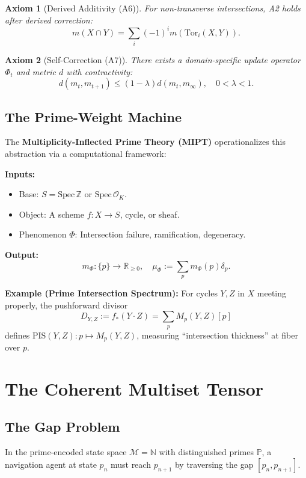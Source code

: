 \documentclass[12pt,a4paper]{article}
\newtheorem{axiom}{Axiom}[section]
\begin{document}
\begin{axiom}[Derived Additivity (A6)]
For non-transverse intersections, A2 holds after derived correction:
\[
m(X \cap Y) = \sum_i (-1)^i m(\text{Tor}_i(X, Y)).
\]
\end{axiom}

\begin{axiom}[Self-Correction (A7)]
There exists a domain-specific update operator $\Phi_t$ and metric $d$ with contractivity:
\[
d(m_t, m_{t+1}) \le (1 - \lambda) d(m_t, m_\infty), \quad 0 < \lambda < 1.
\]
\end{axiom}

\subsection{The Prime-Weight Machine}

The \textbf{Multiplicity-Inflected Prime Theory (MIPT)} operationalizes this abstraction via a computational framework:

\textbf{Inputs:}
\begin{itemize}
\item Base: $S = \text{Spec}\,\mathbb{Z}$ or $\text{Spec}\,\mathcal{O}_K$.
\item Object: A scheme $f: X \to S$, cycle, or sheaf.
\item Phenomenon $\Phi$: Intersection failure, ramification, degeneracy.
\end{itemize}

\textbf{Output:}
\[
m_\Phi: \{p\} \to \mathbb{R}_{\ge 0}, \quad \mu_\Phi := \sum_p m_\Phi(p) \delta_p.
\]

\textbf{Example (Prime Intersection Spectrum):} For cycles $Y, Z$ in $X$ meeting properly, the pushforward divisor
\[
D_{Y,Z} := f_*(Y \cdot Z) = \sum_p M_p(Y,Z) [p]
\]
defines $\text{PIS}(Y,Z): p \mapsto M_p(Y,Z)$, measuring ``intersection thickness'' at fiber over $p$.

\section{The Coherent Multiset Tensor}
\label{sec:cmt}

\subsection{The Gap Problem}

In the prime-encoded state space $\mathcal{M} = \mathbb{N}$ with distinguished primes $\mathbb{P}$, a navigation agent at state $p_n$ must reach $p_{n+1}$ by traversing the gap $[p_n, p_{n+1}]$.
\end{document}
